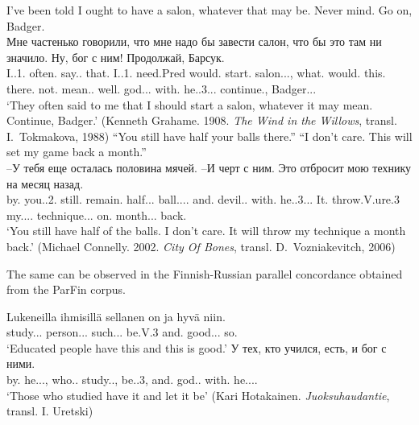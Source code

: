 \documentclass[output=paper]{langscibook}
\begin{document}
\ea
\ea
 I’ve been told I ought to have a salon, whatever that may be. Never mind. Go on, Badger. \\
\gll  Мне частенько говорили, что мне надо бы завести салон, что бы это там ни значило. Ну, бог с ним! Продолжай, Барсук.\\
     I.{\PRON}.1.{\DAT}{\SG} often.{\ADV} say.{\PAST}.{\PL} that.{\PRON} I.{\PRON}.1.{\DAT}{\SG} need.Pred would.{\PTCP} start.{\INF} salon.{\NOUN}.{\ACC}.{\SG}, what.{\PRON} would.{\PTCP} this.{\PRON} there.{\ADV} not.{\PTCP} mean.{\PAST}. well.{\PTCP} god.{\NOUN}.{\NOM}.{\SG} with.{\PREP} he.{\PRON}.3.{\INSTR}.{\SG}. continue.{\IMP}, Badger.{\NOUN}.{\NOM}.\\
\glt `They often said to me that I should start a salon, whatever it may mean. Continue, Badger.' (Kenneth Grahame. 1908. \textit{The Wind in the Willows}, transl. I.~Tokmakova, 1988)
\ex
  “You still have half your balls there.” “I don’t care. This will set my game back a month.”\\
\gll –У тебя еще осталась половина мячей. –И черт с ним. Это отбросит мою технику на месяц назад.\\
     by.{\PREP} you.{\PRON}.2.{\GEN}{\SG} still.{\PTCP} remain.{\PAST}{\F}{\SG} half.{\NOUN}.{\NOM}.{\SG} ball.{\NOUN}.{\GEN}.{\PL}. and.{\PTCP} devil.{\NOUN}.{\NOM} with.{\PREP} he.{\PRON}.3.{\INSTR}.{\SG}. It.{\PRON} throw.V.{\FUT}ure.3{\SG} my.{\PRON}.{\POSS}{\F}.{\ACC}.{\SG} technique.{\NOUN}.{\ACC}.{\SG} on.{\PREP} month.{\NOUN}.{\ACC}.{\SG} back.{\ADV}\\
\glt `You still have half of the balls. I don’t care. It will throw my technique a month back.' (Michael Connelly. 2002. \textit{City Of Bones}, transl. D.~Vozniakevitch, 2006)
\z
\z

The same can be observed in the Finnish-Russian parallel concordance obtained from the ParFin corpus.

\ea \gll Lukeneilla ihmisillä sellanen on ja hyvä niin.\\
     study.{\PTCP}.{\ALL}.{\PL} person.{\NOUN}.{\ALL}.{\PL} such.{\ADJ}.{\NOM}.{\SG} be.V.3{\PRES}{\SG} and.{\CONJ} good.{\ADJ}.{\NOM}.{\SG} so.{\ADV}\\
\glt `Educated people have this and this is good.'
\ex
\gll У тех, кто учился, есть, и бог с ними.\\
     by.{\PREP} he.{\PRON}.{\GEN}.{\PL}, who.{\PRON}.{\NOM} study.{\PAST}.{\glossM}{\SG}, be.{\PRES}.3, and.{\PTCP} god.{\NOUN}.{\NOM} with.{\PREP} he.{\PRON}.{\INSTR}.{\PL}.\\
\glt `Those who studied have it and let it be' (Kari Hotakainen. \textit{Juoksuhaudantie}, transl. I. Uretski)
\end{document}
